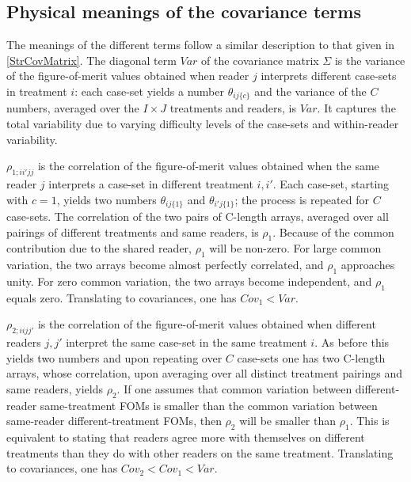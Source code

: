 \documentclass[
]{book}
\begin{document}
\hypertarget{physical-meanings-of-the-covariance-terms}{%
\subsection{Physical meanings of the covariance terms}\label{physical-meanings-of-the-covariance-terms}}

The meanings of the different terms follow a similar description to that given in \ref{StrCovMatrix}. The diagonal term \(Var\) of the covariance matrix \(\Sigma\) is the variance of the figure-of-merit values obtained when reader \(j\) interprets different case-sets in treatment \(i\): each case-set yields a number \(\theta_{ij\{c\}}\) and the variance of the \(C\) numbers, averaged over the \(I \times J\) treatments and readers, is \(Var\). It captures the total variability due to varying difficulty levels of the case-sets and within-reader variability.

\(\rho_{1;ii'jj}\) is the correlation of the figure-of-merit values obtained when the same reader \(j\) interprets a case-set in different treatment \(i,i'\). Each case-set, starting with \(c = 1\), yields two numbers \(\theta_{ij\{1\}}\) and \(\theta_{i'j\{1\}}\); the process is repeated for \(C\) case-sets. The correlation of the two pairs of C-length arrays, averaged over all pairings of different treatments and same readers, is \(\rho_1\). Because of the common contribution due to the shared reader, \(\rho_1\) will be non-zero. For large common variation, the two arrays become almost perfectly correlated, and \(\rho_1\) approaches unity. For zero common variation, the two arrays become independent, and \(\rho_1\) equals zero. Translating to covariances, one has \(Cov_1 < Var\).

\(\rho_{2;iijj'}\) is the correlation of the figure-of-merit values obtained when different readers \(j,j'\) interpret the same case-set in the same treatment \(i\). As before this yields two numbers and upon repeating over \(C\) case-sets one has two C-length arrays, whose correlation, upon averaging over all distinct treatment pairings and same readers, yields \(\rho_2\). If one assumes that common variation between different-reader same-treatment FOMs is smaller than the common variation between same-reader different-treatment FOMs, then \(\rho_2\) will be smaller than \(\rho_1\). This is equivalent to stating that readers agree more with themselves on different treatments than they do with other readers on the same treatment. Translating to covariances, one has \(Cov_2 < Cov_1 < Var\).
\end{document}
